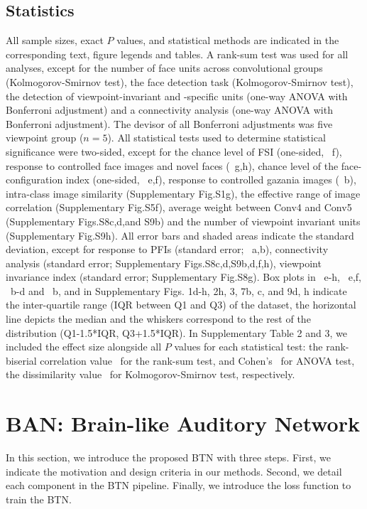 \documentclass[sn-mathphys]{sn-jnl}%
\theoremstyle{thmstyleone}%
\theoremstyle{thmstyletwo}%
\theoremstyle{thmstylethree}%
\begin{document}
\subsection{Statistics}
All sample sizes, exact $ P $ values, and statistical methods are indicated in the corresponding text, figure legends and tables.
A rank-sum test was used for all analyses, 
except for the number of face units across convolutional groups (Kolmogorov-Smirnov test),
the face detection task (Kolmogorov-Smirnov test),
the detection of viewpoint-invariant and -specific units (one-way ANOVA with Bonferroni adjustment)
and a connectivity analysis (one-way ANOVA with Bonferroni adjustment).
The devisor of all Bonferroni adjustments was five viewpoint group ($ n = 5 $).
All statistical tests used to determine statistical significance were two-sided, except for the chance level of FSI (one-sided, ~f),
response to controlled face images and novel faces (~g,h),
chance level of the face-configuration index (one-sided, ~e,f),
response to controlled gazania images (~b),
intra-class image similarity (Supplementary Fig.S1g),
the effective range of image correlation (Supplementary Fig.S5f),
average weight between Conv4 and Conv5 (Supplementary Figs.S8c,d,and S9b)
and the number of viewpoint invariant units (Supplementary Fig.S9h).
All error bars and shaded areas indicate the standard deviation, 
except for response to PFIs (standard error; ~a,b),
connectivity analysis (standard error; Supplementary Figs.S8c,d,S9b,d,f,h),
viewpoint invariance index (standard error; Supplementary Fig.S8g).
Box plots in ~e-h, ~e,f, ~b-d and ~b, and in Supplementary Figs. 1d-h, 2h, 3, 7b, c, and 9d, h indicate the inter-quartile range (IQR between Q1 and Q3) of the dataset, 
the horizontal line depicts the median and the whiskers correspond to the rest of the distribution (Q1-1.5*IQR, Q3+1.5*IQR).
In Supplementary Table 2 and 3, we included the effect size alongside all $ P $ values for each statistical test:
the rank-biserial correlation value~\cite{cureton1956rank} for the rank-sum test, 
and Cohen's~\cite{cohen2013statistical} for ANOVA test, the dissimilarity value~\cite{vermeesch2013multi} for Kolmogorov-Smirnov test, respectively.



\section{BAN: Brain-like Auditory Network} 
In this section, we introduce the proposed BTN with three steps. 
First, we indicate the motivation and design criteria in our methods.
Second, we detail each component in the BTN pipeline. 
Finally, we introduce the loss function to train the BTN. \par
\end{document}
